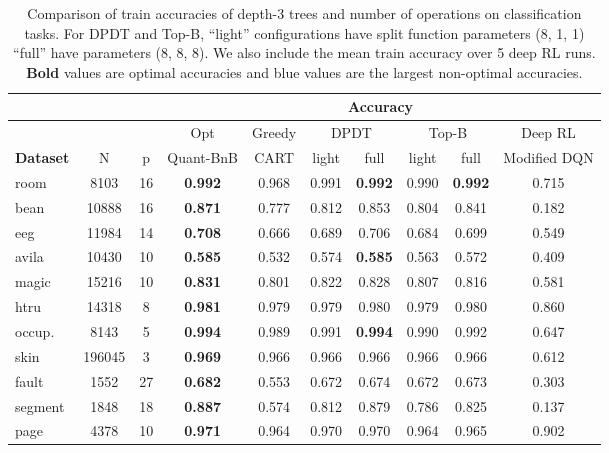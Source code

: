 \begin{table}
    \centering
    \tiny
    \caption{Comparison of train accuracies of depth-3 trees and number of operations on classification tasks. For DPDT and Top-B, ``light'' configurations have split function parameters (8, 1, 1) ``full'' have parameters (8, 8, 8). We also include the mean train accuracy over 5 deep RL runs. \textbf{Bold} values are optimal accuracies and {\color{blue} blue} values are the largest non-optimal accuracies.}
    \label{tab:tree_comparison_combined}
    \begin{tabular}{l|cc||cc|cc|cc|c}
    \toprule
    & & & \multicolumn{7}{c}{\textbf{Accuracy}}\\
    \midrule
    & & & Opt & Greedy & \multicolumn{2}{c|}{DPDT} & \multicolumn{2}{c|}{Top-B} & Deep RL\\
    \textbf{Dataset} & N & p & Quant-BnB & CART & light & full & light & full & Modified DQN \\
    \midrule
    room & 8103 & 16 & \textbf{0.992} & 0.968 & \color{blue} 0.991 & \textbf{0.992} & 0.990 & \textbf{0.992} & 0.715 \\
    bean & 10888 & 16  & \textbf{0.871} & 0.777 & 0.812 & \color{blue} 0.853 & 0.804 & 0.841 & 0.182 \\
    eeg & 11984 & 14  & \textbf{0.708} & 0.666 & 0.689 & \color{blue} 0.706 & 0.684 & 0.699 & 0.549 \\
    avila & 10430 & 10  & \textbf{0.585} & 0.532 & \color{blue}0.574 & \textbf{0.585} & 0.563 & 0.572 & 0.409 \\
    magic & 15216 & 10 & \textbf{0.831} & 0.801 & 0.822 & \color{blue} 0.828 & 0.807 & 0.816 & 0.581 \\
    htru & 14318 & 8  & \textbf{0.981} & 0.979 & 0.979 & \color{blue}0.980 & 0.979 & \color{blue}0.980 & 0.860 \\
    occup. & 8143 & 5 & \textbf{0.994} & 0.989 & 0.991 & \textbf{0.994} & 0.990 & \color{blue}0.992 & 0.647 \\
    skin & 196045 & 3 & \textbf{0.969} & \color{blue}0.966 & \color{blue}0.966 & \color{blue}0.966 & \color{blue}0.966 & \color{blue}0.966 & 0.612 \\
    fault & 1552 & 27 & \textbf{0.682} & 0.553 & 0.672 & \color{blue}0.674 & 0.672 & 0.673 & 0.303 \\
    segment & 1848 & 18 & \textbf{0.887} & 0.574 & 0.812 & \color{blue}0.879 & 0.786 & 0.825 & 0.137 \\
    page & 4378 & 10 &  \textbf{0.971} & 0.964 & \color{blue}0.970 & \color{blue}0.970 & 0.964 & 0.965 & 0.902 \\

\end{tabular}
\end{table}
